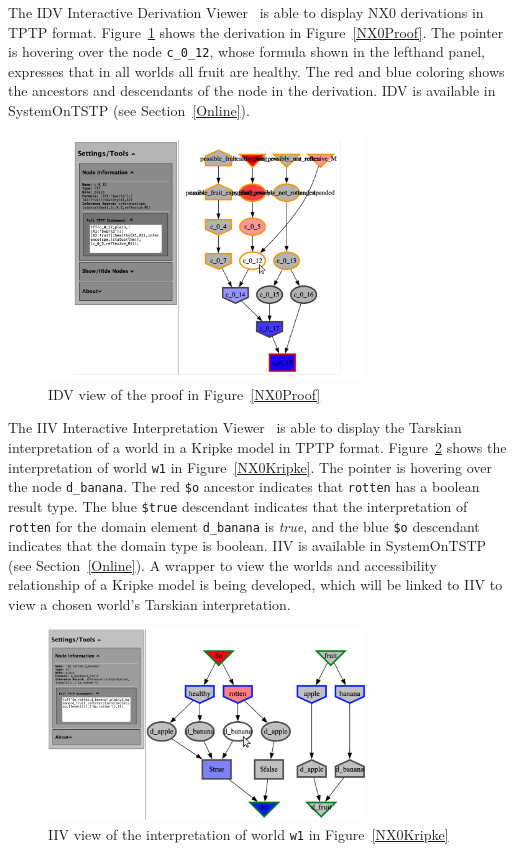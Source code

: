 \documentclass{ceurart}
\begin{document}
The IDV Interactive Derivation Viewer~\cite{TPS07} is able to display NX0 derivations in TPTP 
format.
Figure~\ref{NX0ProofIDV} shows the derivation in Figure~\ref{NX0Proof}.
The pointer is hovering over the node {\tt c\_0\_12}, whose formula shown in the lefthand panel,
expresses that in all worlds all fruit are healthy.
The red and blue coloring shows the ancestors and descendants of the node in the derivation.
IDV is available in SystemOnTSTP (see Section~\ref{Online}).

\begin{figure}[htbp]
\centering
\includegraphics[width=0.75\textwidth]{NX0ProofIDV.pdf}
\caption{IDV view of the proof in Figure~\ref{NX0Proof}}
\label{NX0ProofIDV}
\end{figure}

The IIV Interactive Interpretation Viewer~\cite{SS+23-LPAR,MS23-Poster} is able to display the
Tarskian interpretation of a world in a Kripke model in TPTP format.
Figure~\ref{NX0InterpretationW1} shows the interpretation of world {\tt w1} in 
Figure~\ref{NX0Kripke}.
The pointer is hovering over the node {\tt d\_banana}.
The red {\tt \$o} ancestor indicates that {\tt rotten} has a boolean result type.
The blue {\tt \$true} descendant indicates that the interpretation of {\tt rotten} for the
domain element {\tt d\_banana} is {\em true}, and the blue {\tt \$o} descendant indicates that the
domain type is boolean.
IIV is available in SystemOnTSTP (see Section~\ref{Online}).
A wrapper to view the worlds and accessibility relationship of a Kripke model is being developed,
which will be linked to IIV to view a chosen world's Tarskian interpretation.

\begin{figure}[htbp]
\centering
\includegraphics[width=0.75\textwidth]{NX0InterpretationW1.pdf}
\caption{IIV view of the interpretation of world {\tt w1} in Figure~\ref{NX0Kripke}}
\label{NX0InterpretationW1}
\end{figure}
\end{document}
